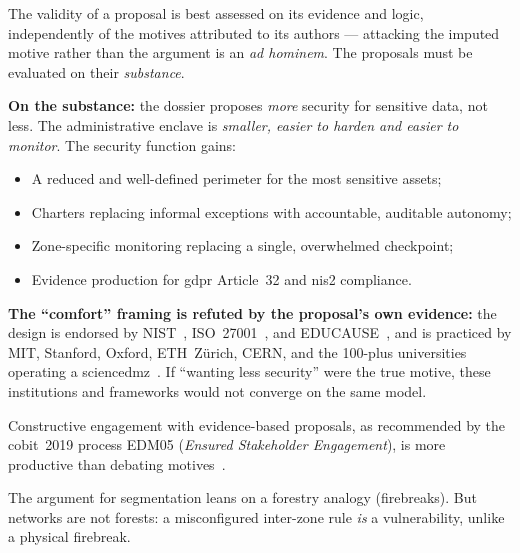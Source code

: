 \begin{answerbox}[Answer to Q1.3]
The validity of a proposal is best assessed on its evidence and logic, independently of the motives attributed to its authors --- attacking the imputed motive rather than the argument is an \emph{ad hominem}. The proposals must be evaluated on their \emph{substance}.

\medskip\noindent\textbf{On the substance:} the dossier proposes \emph{more} security for sensitive data, not less. The administrative enclave is \emph{smaller, easier to harden and easier to monitor}. The security function gains:
\begin{itemize}[nosep]
    \item A reduced and well-defined perimeter for the most sensitive assets;
    \item Charters replacing informal exceptions with accountable, auditable autonomy;
    \item Zone-specific monitoring replacing a single, overwhelmed checkpoint;
    \item Evidence production for \gls{gdpr} Article~32 and \gls{nis2} compliance.
\end{itemize}

\noindent\textbf{The ``comfort'' framing is refuted by the proposal's own evidence:} the design is endorsed by NIST~\cite{nist-csf, nist-sp800-53}, ISO~27001~\cite{iso27001}, and EDUCAUSE~\cite{educause2024}, and is practiced by MIT, Stanford, Oxford, ETH~Z\"urich, CERN, and the 100-plus universities operating a \gls{sciencedmz}~\cite{esnet-history,nsf-cc}. If ``wanting less security'' were the true motive, these institutions and frameworks would not converge on the same model.

\medskip\noindent Constructive engagement with evidence-based proposals, as recommended by the \gls{cobit}~2019 process EDM05 (\emph{Ensured Stakeholder Engagement}), is more productive than debating motives~\cite{cobit}.
\end{answerbox}

\bigskip

\begin{questionbox}
The argument for segmentation leans on a forestry analogy (firebreaks). But networks are not forests: a misconfigured inter-zone rule \emph{is} a vulnerability, unlike a physical firebreak.
\end{questionbox}

